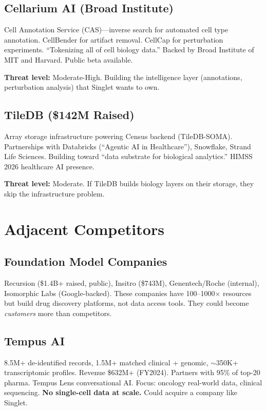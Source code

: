 \documentclass[10pt,twocolumn,letterpaper]{article}
\begin{document}
\subsection{Cellarium AI (Broad Institute)}

Cell Annotation Service (CAS)---inverse search for automated cell type annotation.
CellBender for artifact removal. CellCap for perturbation experiments.
``Tokenizing all of cell biology data.'' Backed by Broad Institute of MIT and
Harvard. Public beta available.

\textbf{Threat level:} Moderate-High. Building the intelligence layer
(annotations, perturbation analysis) that Singlet wants to own.

\subsection{TileDB (\$142M Raised)}

Array storage infrastructure powering Census backend (TileDB-SOMA). Partnerships
with Databricks (``Agentic AI in Healthcare''), Snowflake, Strand Life Sciences.
Building toward ``data substrate for biological analytics.'' HIMSS 2026 healthcare
AI presence.

\textbf{Threat level:} Moderate. If TileDB builds biology layers on their storage,
they skip the infrastructure problem.

\section{Adjacent Competitors}
\label{sec:adjacent}

\subsection{Foundation Model Companies}

Recursion (\$1.4B+ raised, public), Insitro (\$743M), Genentech/Roche (internal),
Isomorphic Labs (Google-backed). These companies have 100--1000$\times$ resources
but build drug discovery platforms, not data access tools. They could become
\emph{customers} more than competitors.

\subsection{Tempus AI}

8.5M+ de-identified records, 1.5M+ matched clinical + genomic, $\sim$350K+
transcriptomic profiles. Revenue \$632M+ (FY2024). Partners with 95\% of top-20
pharma. Tempus Lens conversational AI. Focus: oncology real-world data, clinical
sequencing. \textbf{No single-cell data at scale.} Could acquire a company like
Singlet.
\end{document}
